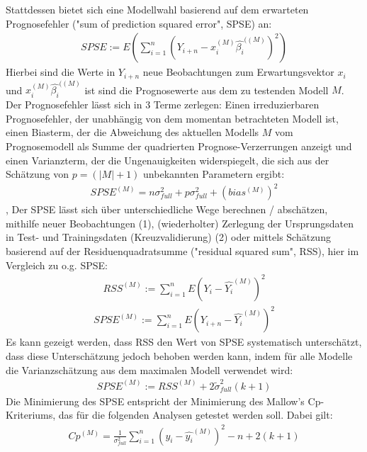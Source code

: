 	Stattdessen bietet sich eine Modellwahl basierend auf dem erwarteten Prognosefehler ("sum of prediction squared error", SPSE) an: 
	\begin{align}
		SPSE := E(\sum_{i=1}^{n} (Y_{i+n} - x_{i}^{(M)}\hat{\beta_i}^{((M)})^2)
	\end{align}
	Hierbei sind die Werte in $Y_{i+n}$ neue Beobachtungen zum Erwartungsvektor $x_i$ und $x_{i}^{(M)}\hat{\beta_i}^{((M)}$ ist sind die Prognosewerte aus dem zu testenden Modell $M$. 
	Der Prognosefehler lässt sich in 3 Terme zerlegen: Einen irreduzierbaren Prognosefehler, der unabhängig von dem momentan betrachteten Modell ist, einen Biasterm, der die Abweichung des aktuellen Modells $M$ vom Prognosemodell als Summe der quadrierten Prognose-Verzerrungen anzeigt und einen Varianzterm, der die Ungenauigkeiten widerspiegelt, die sich aus der Schätzung von $p = (|M|+1)$ unbekannten Parametern ergibt:
	\begin{align}
	SPSE^{(M)} = n\sigma_{full}^2 + p\sigma_{full}^2 + (bias^{(M)})^2
	\end{align},
	Der SPSE lässt sich über unterschiedliche Wege berechnen / abschätzen, mithilfe neuer Beobachtungen (1), (wiederholter) Zerlegung der Ursprungsdaten in Test- und Trainingsdaten (Kreuzvalidierung) (2) oder mittels Schätzung basierend auf der Residuenquadratsumme ("residual squared sum", RSS), hier im Vergleich zu o.g. SPSE:
	\begin{align}
	RSS^{(M)} := \sum_{i=1}^{n} E (Y_{i} - \hat{Y_i}^{(M)})^2
	\end{align}
	\begin{align}
	SPSE^{(M)} := \sum_{i=1}^{n} E (Y_{i+n} - \hat{Y_i}^{(M)})^2
	\end{align}
	Es kann gezeigt werden, dass RSS den Wert von SPSE systematisch unterschätzt, dass diese Unterschätzung jedoch behoben werden kann, indem für alle Modelle die Varianzschätzung aus dem maximalen Modell verwendet wird\cite{Schumacher.2019}: 
	\begin{align}
	SPSE^{(M)} := RSS^{(M)} + 2 \tilde{\sigma}_{full} ^2 (k+1)
	\end{align}
	Die Minimierung des SPSE entspricht der Minimierung des Mallow's Cp- Kriteriums, das für die folgenden Analysen getestet werden soll. Dabei gilt:
	\begin{align}
	Cp^{(M)} = \frac{1}{\sigma_{full}^2} \sum_{i=1}^{n} (y_i - \hat{y_i}^{(M)})^2 - n + 2(k+1)
	\end{align}
	
	

